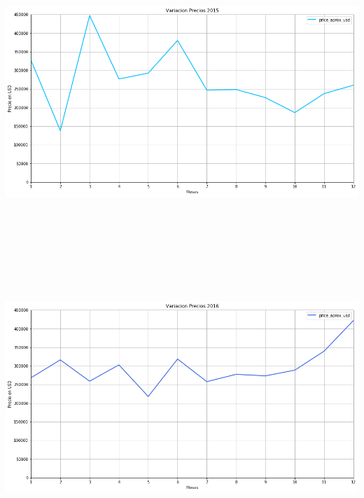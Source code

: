 \documentclass[a4paper, 10pt]{article}
\begin{document}
        \begin{center}
       				\includegraphics[width=6in, height=4.2in]{images/variacion2015}
		   	\end{center}
        \begin{center}
       				\includegraphics[width=6in, height=4.2in]{images/variacion2016}
		   	\end{center}
\end{document}
